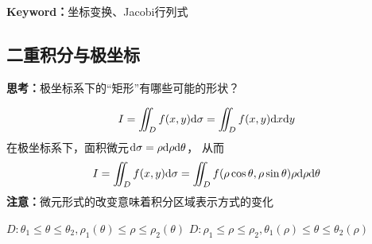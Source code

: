 {\bf Keyword：}坐标变换、Jacobi行列式

\subsection{二重积分与极坐标}

{\bf 思考：}极坐标系下的“矩形”有哪些可能的形状？

$$I=\iint_Df(x,y)\mathrm{d}\sigma=\iint_Df(x,y)\mathrm{d} x\mathrm{d} y$$
在极坐标系下，面积微元${\mathrm{d}\sigma=\rho \mathrm{d}\rho \mathrm{d}\theta}$， 
从而
$${I=\iint_Df(x,y)\mathrm{d}\sigma=\iint_Df(\rho\cos\theta,\rho\sin\theta)
\rho \mathrm{d}\rho \mathrm{d}\theta}$$
{\bf 注意：}微元形式的改变意味着积分区域表示方式的变化

\begin{center}
	\hspace{2cm}
	
	$D:\theta_1\leq\theta\leq\theta_2,\rho_1(\theta)\leq\rho\leq\rho_2(\theta)$
	\hspace{2cm}
	$D:\rho_1\leq\rho\leq\rho_2,\theta_1(\rho)\leq\theta\leq\theta_2(\rho)$
\end{center}


